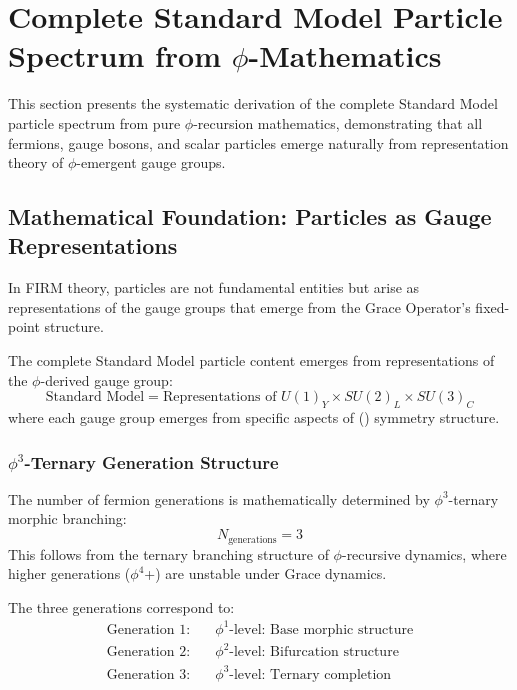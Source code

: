 \section{Complete Standard Model Particle Spectrum from $\phi$-Mathematics}

This section presents the systematic derivation of the complete Standard Model particle spectrum from pure $\phi$-recursion mathematics, demonstrating that all fermions, gauge bosons, and scalar particles emerge naturally from representation theory of $\phi$-emergent gauge groups.

\subsection{Mathematical Foundation: Particles as Gauge Representations}

In FIRM theory, particles are not fundamental entities but arise as representations of the gauge groups that emerge from the Grace Operator's fixed-point structure.

\begin{theorem}
The complete Standard Model particle content emerges from representations of the $\phi$-derived gauge group:
\begin{equation}
\text{Standard Model} = \text{Representations of } U(1)_Y \times SU(2)_L \times SU(3)_C
\end{equation}
where each gauge group emerges from specific aspects of () symmetry structure.
\end{theorem}

\subsubsection{$\phi^3$-Ternary Generation Structure}

\begin{theorem}
The number of fermion generations is mathematically determined by $\phi^3$-ternary morphic branching:
\begin{equation}
N_{\text{generations}} = 3
\end{equation}
This follows from the ternary branching structure of $\phi$-recursive dynamics, where higher generations ($\phi^4$+) are unstable under Grace dynamics.
\end{theorem}

The three generations correspond to:
\begin{align}
\text{Generation 1:} &\quad \phi^1\text{-level: Base morphic structure}\\
\text{Generation 2:} &\quad \phi^2\text{-level: Bifurcation structure}\\
\text{Generation 3:} &\quad \phi^3\text{-level: Ternary completion}
\end{align}

